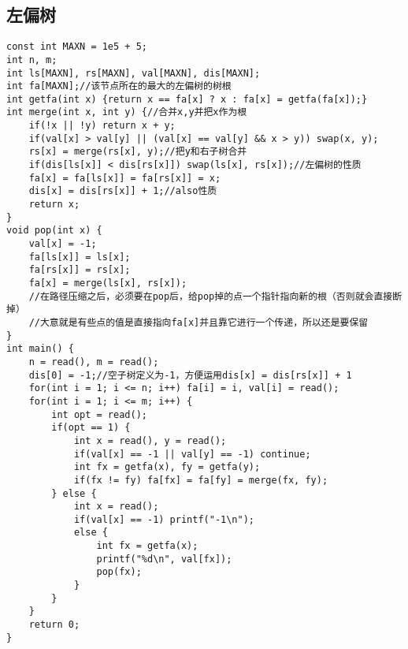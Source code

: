\documentclass{article}
\begin{document}
\subsection{左偏树}
\begin{lstlisting}
const int MAXN = 1e5 + 5;
int n, m;
int ls[MAXN], rs[MAXN], val[MAXN], dis[MAXN];
int fa[MAXN];//该节点所在的最大的左偏树的树根
int getfa(int x) {return x == fa[x] ? x : fa[x] = getfa(fa[x]);}
int merge(int x, int y) {//合并x,y并把x作为根
    if(!x || !y) return x + y;
    if(val[x] > val[y] || (val[x] == val[y] && x > y)) swap(x, y);
    rs[x] = merge(rs[x], y);//把y和右子树合并
    if(dis[ls[x]] < dis[rs[x]]) swap(ls[x], rs[x]);//左偏树的性质
    fa[x] = fa[ls[x]] = fa[rs[x]] = x;
    dis[x] = dis[rs[x]] + 1;//also性质
    return x; 
}
void pop(int x) {
    val[x] = -1;
    fa[ls[x]] = ls[x];
    fa[rs[x]] = rs[x];
    fa[x] = merge(ls[x], rs[x]);
    //在路径压缩之后，必须要在pop后，给pop掉的点一个指针指向新的根（否则就会直接断掉）
    //大意就是有些点的值是直接指向fa[x]并且靠它进行一个传递，所以还是要保留
}
int main() {
    n = read(), m = read();
    dis[0] = -1;//空子树定义为-1，方便运用dis[x] = dis[rs[x]] + 1
    for(int i = 1; i <= n; i++) fa[i] = i, val[i] = read();
    for(int i = 1; i <= m; i++) {
        int opt = read();
        if(opt == 1) {
            int x = read(), y = read();
            if(val[x] == -1 || val[y] == -1) continue;
            int fx = getfa(x), fy = getfa(y);
            if(fx != fy) fa[fx] = fa[fy] = merge(fx, fy);
        } else {
            int x = read();
            if(val[x] == -1) printf("-1\n");
            else {
                int fx = getfa(x);
                printf("%d\n", val[fx]);
                pop(fx);
            }
        }
    }
    return 0;
}
\end{lstlisting}
\end{document}
